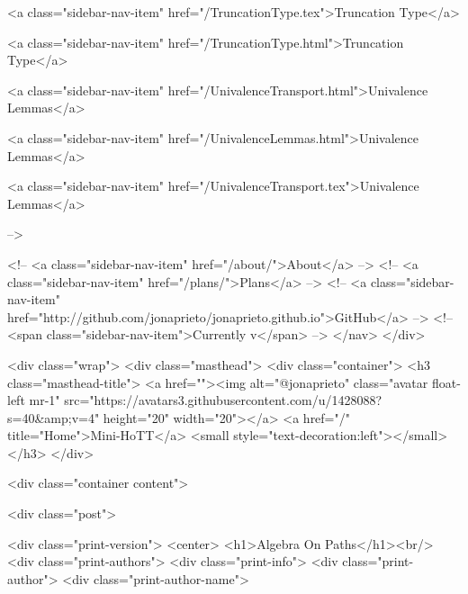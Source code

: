       
    
      
        
          <a class="sidebar-nav-item" href="/TruncationType.tex">Truncation Type</a>
        
      
    
      
        
          <a class="sidebar-nav-item" href="/TruncationType.html">Truncation Type</a>
        
      
    
      
        
          <a class="sidebar-nav-item" href="/UnivalenceTransport.html">Univalence Lemmas</a>
        
      
    
      
        
          <a class="sidebar-nav-item" href="/UnivalenceLemmas.html">Univalence Lemmas</a>
        
      
    
      
        
          <a class="sidebar-nav-item" href="/UnivalenceTransport.tex">Univalence Lemmas</a>
        
      
     -->

    <!-- <a class="sidebar-nav-item" href="/about/">About</a> -->
    <!-- <a class="sidebar-nav-item" href="/plans/">Plans</a> -->
    <!-- <a class="sidebar-nav-item" href="http://github.com/jonaprieto/jonaprieto.github.io">GitHub</a> -->
    <!-- <span class="sidebar-nav-item">Currently v</span> -->
  </nav>
</div>

    <div class="wrap">
      <div class="masthead">
        <div class="container">
          <h3 class="masthead-title">
            <a href=""><img alt="@jonaprieto" class="avatar float-left mr-1" src="https://avatars3.githubusercontent.com/u/1428088?s=40&amp;v=4" height="20" width="20"></a>
            <a href="/" title="Home">Mini-HoTT</a>
            <small style="text-decoration:left"></small>
          </h3>
        </div>
      
      <div class="container content">
        







<div class="post">

  <div class="print-version">
    <center>
      <h1>Algebra On Paths</h1><br/>
        <div class="print-authors">
          <div class="print-info">
            <div class="print-author">
              <div class="print-author-name">
                
